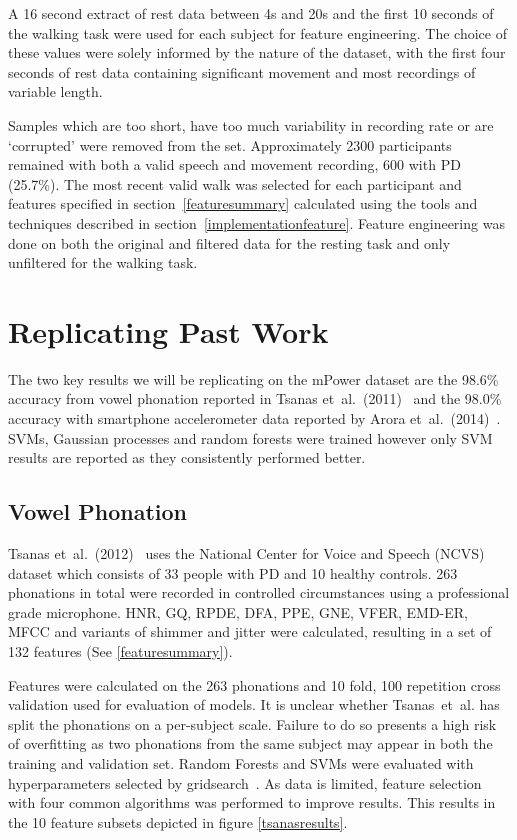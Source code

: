 \documentclass[12pt, twoside]{book}
\begin{document}
A 16 second extract of rest data between 4s and 20s and the first 10 seconds of the walking task were used for each subject for feature engineering. The choice of these values were solely informed by the nature of the dataset, with the first four seconds of rest data containing significant movement and most recordings of variable length.

Samples which are too short, have too much variability in recording rate or are `corrupted' were removed from the set. Approximately 2300 participants remained with both a valid speech and movement recording, 600 with PD (25.7\%). The most recent valid walk was selected for each participant and features specified in section~\ref{featuresummary} calculated using the tools and techniques described in section~\ref{implementationfeature}.  Feature engineering was done on both the original and filtered data for the resting task and only unfiltered for the walking task. 


\section{Replicating Past Work}
The two key results we will be replicating on the mPower dataset are the 98.6\% accuracy from vowel phonation reported in Tsanas et~al.~(2011)~\cite{tsanas2012novel} and the 98.0\% accuracy with smartphone accelerometer data reported by Arora et~al.~(2014)~\cite{arora2014high}. SVMs, Gaussian processes and random forests were trained however only SVM results are reported as they consistently performed better.

\subsection{Vowel Phonation}
\label{phonationpast}
Tsanas et~al.~(2012)~\cite{tsanas2012novel} uses the National Center for Voice and Speech (NCVS) dataset which consists of 33 people with PD and 10 healthy controls. 263 phonations in total were recorded in controlled circumstances using a professional grade microphone. HNR, GQ, RPDE, DFA, PPE, GNE, VFER, EMD-ER, MFCC and variants of shimmer and jitter were calculated, resulting in a set of 132 features (See \ref{featuresummary}).

Features were calculated on the 263 phonations and 10 fold, 100 repetition cross validation used for evaluation of models. It is unclear whether Tsanas~et~al. has split the phonations on a per-subject scale. Failure to do so presents a high risk of overfitting as two phonations from the same subject may appear in both the training and validation set. Random Forests and SVMs were evaluated with hyperparameters selected by gridsearch~\cite{gridsearch}. As data is limited, feature selection with four common algorithms was performed to improve results. This results in the 10 feature subsets depicted in figure \ref{tsanasresults}.
\end{document}
